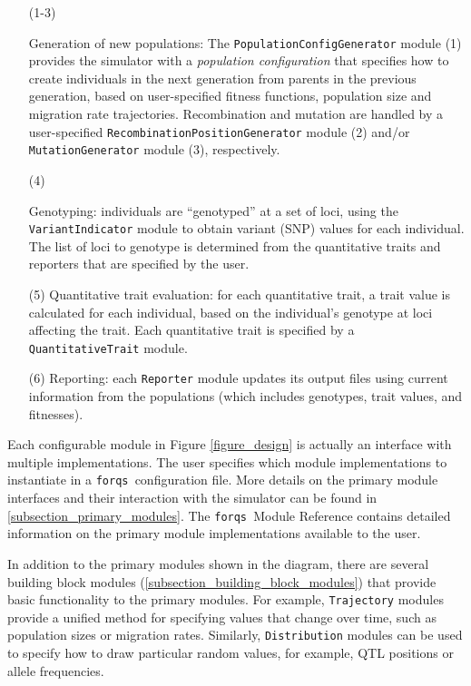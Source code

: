 \documentclass{article}
\newcommand{\forqs}[0]{\texttt{forqs }}
\begin{document}
\begin{itemize}
    \item[(1-3)] \begin{sloppypar} 
        Generation of new populations: The
        \texttt{Population\-Config\-Generator} module (1) provides the
        simulator with a \emph{population configuration} that specifies how to
        create individuals in the next generation from parents in the previous
        generation, based on user-specified fitness functions, population size and migration rate
        trajectories.  Recombination and mutation are handled by a user-specified
        \texttt{Recombination\-Position\-Generator} module (2) and/or
        \texttt{Mutation\-Generator} module (3), respectively.
        \end{sloppypar}
    \item [(4)] \begin{sloppypar} Genotyping:  individuals are ``genotyped'' at a set of loci,
        using the \texttt{Variant\-Indicator} module to obtain variant (SNP)
        values for each individual.  The list of loci to genotype is determined
        from the quantitative traits and reporters that are specified by the
        user.  \end{sloppypar}
    \item [(5)] Quantitative trait evaluation: for each quantitative trait, a
        trait value is calculated for each individual, based on the
        individual's genotype at loci affecting the trait.  Each quantitative
        trait is specified by a \texttt{Quantitative\-Trait} module.
    \item [(6)] Reporting:  each \texttt{Reporter} module updates its output
        files using current information from the populations (which includes
        genotypes, trait values, and fitnesses).
\end{itemize}

Each configurable module in Figure \ref{figure_design} is actually an interface
with multiple implementations.  The user specifies which module implementations
to instantiate in a \forqs configuration file.  More details on the primary
module interfaces and their interaction with the simulator can be found in
\autoref{subsection_primary_modules}.  The \forqs Module Reference contains
detailed information on the primary module implementations available to the user.

In addition to the primary modules shown in the diagram, there are several
building block modules (\autoref{subsection_building_block_modules}) that
provide basic functionality to the primary modules.  For example,
\texttt{Trajectory} modules provide a unified method for specifying values that
change over time, such as population sizes or migration rates.  Similarly,
\texttt{Distribution} modules can be used to specify how to draw particular
random values, for example, QTL positions or allele frequencies.  
\end{document}
